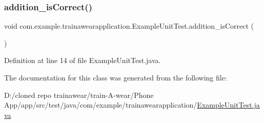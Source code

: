\subsubsection{\texorpdfstring{addition\_isCorrect()}{addition\_isCorrect()}}
{\footnotesize\ttfamily void com.\+example.\+trainawearapplication.\+Example\+Unit\+Test.\+addition\+\_\+is\+Correct (\begin{DoxyParamCaption}{ }\end{DoxyParamCaption})}



Definition at line 14 of file Example\+Unit\+Test.\+java.


\begin{DoxyCode}{0}

\end{DoxyCode}


The documentation for this class was generated from the following file\+:\begin{DoxyCompactItemize}
\item 
D\+:/cloned repo trainawear/train-\/\+A-\/wear/\+Phone App/app/src/test/java/com/example/trainawearapplication/\mbox{\hyperlink{_example_unit_test_8java}{Example\+Unit\+Test.\+java}}\end{DoxyCompactItemize}
